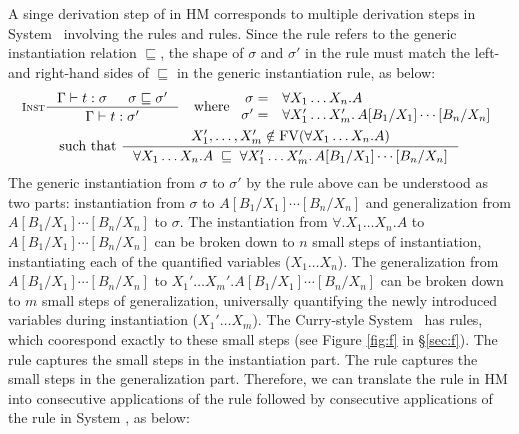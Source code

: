 A singe derivation step of  in HM corresponds to
multiple derivation steps in System \F\ involving
the rules  and  rules.
Since the  rule refers to the generic instantiation relation
$\sqsubseteq$, the shape of $\sigma$ and $\sigma'$ in the  rule
must match the left- and right-hand sides of $\sqsubseteq$
in the generic instantiation rule, as below:
\begin{multline*}
  \inference[\sc Inst]{\Gamma |- t : \sigma & \sigma \sqsubseteq \sigma'}
		      {\Gamma |- t : \sigma'}
	\quad\text{where}~
	\begin{array}{rl}
		\sigma =& \forall X_1\dots X_n.A ~~~~~~~~~~~~~~~~~~~~~~ \\
	       \sigma' =& \forall X_1'\dots X_m'.\,A[B_1/X_1]\cdots[B_n/X_n]
	\end{array}
 \\ \text{such that}~
   \inference{X_1',\dots,X_m'\notin\FV(\forall X_1\dots X_n.A)}
             {\forall X_1\dots X_n.A \;\sqsubseteq\;
	      \forall X_1'\dots X_m'.\,A[B_1/X_1]\cdots[B_n/X_n]}
\end{multline*}
The generic instantiation from $\sigma$ to $\sigma'$
by the  rule above can be understood as two parts:
instantiation from $\sigma$ to $A[B_1/X_1]\cdots[B_n/X_n]$ and
generalization from $A[B_1/X_1]\cdots[B_n/X_n]$ to $\sigma$.
The instantiation from $\forall.X_1\dots X_n.A$ to $A[B_1/X_1]\cdots[B_n/X_n]$
can be broken down to $n$ small steps of instantiation,
instantiating each of the quantified variables ($X_1\dots X_n$).
The generalization from $A[B_1/X_1]\cdots[B_n/X_n]$ to
$X_1'\dots X_m'.A[B_1/X_1]\cdots[B_n/X_n]$ can be broken down to
$m$ small steps of generalization, universally quantifying
the newly introduced variables during instantiation ($X_1'\dots X_m$).
The Curry-style System \F\ has rules, which coorespond exactly to these 
small steps (see Figure \ref{fig:f} in \S\ref{sec:f}).
The  rule captures the small steps in the instantiation part.
The  rule captures the small steps in the generalization part.
Therefore, we can translate the  rule in HM into
consecutive applications of the  rule followed by
consecutive applications of the  rule in System \F, as below:
